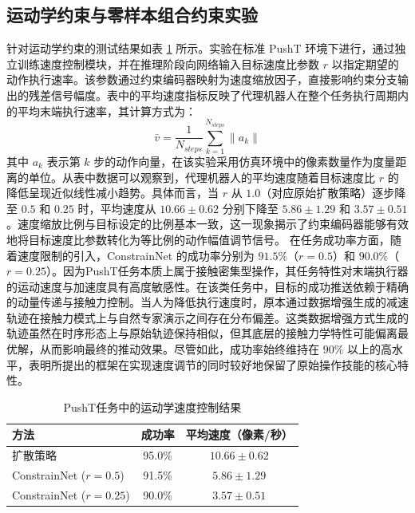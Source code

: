 \subsection{运动学约束与零样本组合约束实验}
针对运动学约束的测试结果如表 \ref{tab:kinematic_results} 所示。实验在标准 PushT 环境下进行，通过独立训练速度控制模块，并在推理阶段向网络输入目标速度比参数 $r$ 以指定期望的动作执行速率。该参数通过约束编码器映射为速度缩放因子，直接影响约束分支输出的残差信号幅度。表中的平均速度指标反映了代理机器人在整个任务执行周期内的平均末端执行速率，其计算方式为：
\begin{equation}
\bar{v} = \frac{1}{N_{steps}}\sum_{k=1}^{N_{steps}}\|a_{k}\|
\end{equation}
其中 $a_{k}$ 表示第 $k$ 步的动作向量，在该实验采用仿真环境中的像素数量作为度量距离的单位。从表中数据可以观察到，代理机器人的平均速度随着目标速度比 $r$ 的降低呈现近似线性减小趋势。具体而言，当 $r$ 从 $1.0$（对应原始扩散策略）逐步降至 $0.5$ 和 $0.25$ 时，平均速度从 $10.66 \pm 0.62$ 分别下降至 $5.86 \pm 1.29$ 和 $3.57 \pm 0.51$。速度缩放比例与目标设定的比例基本一致，这一现象揭示了约束编码器能够有效地将目标速度比参数转化为等比例的动作幅值调节信号。
在任务成功率方面，随着速度限制的引入，ConstrainNet 的成功率分别为 $91.5\%$（$r=0.5$）和 $90.0\%$（$r=0.25$）。因为PushT任务本质上属于接触密集型操作，其任务特性对末端执行器的运动速度与加速度具有高度敏感性。在该类任务中，目标的成功推送依赖于精确的动量传递与接触力控制。当人为降低执行速度时，原本通过数据增强生成的减速轨迹在接触力模式上与自然专家演示之间存在分布偏差。这类数据增强方式生成的轨迹虽然在时序形态上与原始轨迹保持相似，但其底层的接触力学特性可能偏离最优解，从而影响最终的推动效果。尽管如此，成功率始终维持在 $90\%$ 以上的高水平，表明所提出的框架在实现速度调节的同时较好地保留了原始操作技能的核心特性。
\begin{table}[htbp]
\centering
\caption{PushT任务中的运动学速度控制结果}
\label{tab:kinematic_results}
\begin{tabular}{lcc}
\hline
方法 & 成功率 & 平均速度（像素/秒） \\ \hline
扩散策略 & 95.0\% & $10.66 \pm 0.62$ \\
ConstrainNet ($r=0.5$) & 91.5\% & $5.86 \pm 1.29$ \\
ConstrainNet ($r=0.25$) & 90.0\% & $3.57 \pm 0.51$ \\ \hline
\end{tabular}
\end{table}

